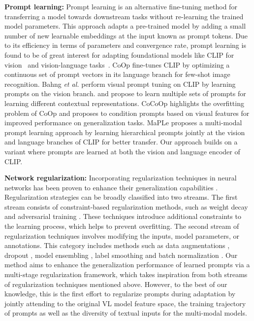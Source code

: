 \documentclass[10pt,twocolumn,letterpaper]{article}
\def\etal{\emph{et al.}\xspace}
\begin{document}
\noindent \textbf{Prompt learning:}
Prompt learning is an alternative fine-tuning method for transferring a model towards downstream tasks without re-learning the trained model parameters. This approach adapts a pre-trained model by adding a small number of new learnable embeddings at the input known as prompt tokens. Due to its efficiency in terms of parameters and convergence rate, prompt learning is found to be of great interest for adapting  foundational models like CLIP for vision~\cite{jia2022visual,zhang2022neural,wang2022dualprompt,wang2022learning} and vision-language tasks~\cite{zhou2022learning,zhou2022conditional, zhu2022prompt, derakhshani2022variational}. CoOp \cite{zhou2022learning} fine-tunes CLIP by optimizing a continuous set of prompt vectors in its language branch for few-shot image recognition. Bahng \etal \cite{bahng2022visual} perform visual prompt tuning on CLIP by learning prompts on the vision branch. \cite{chen2022prompt} and \cite{lu2022prompt} propose to learn multiple sets of prompts for learning different contextual representations. CoCoOp \cite{zhou2022conditional} highlights the overfitting problem of CoOp and proposes to condition prompts based on visual features for improved performance on generalization tasks. {MaPLe \cite{khattak2023maple} proposes a multi-modal prompt learning approach by learning hierarchical prompts jointly at the vision and language branches of CLIP for better transfer.} Our approach builds on a variant \cite{rasheed2023fine} where prompts are learned at both the vision and language encoder of CLIP.

\noindent \textbf{Network regularization:}
Incorporating regularization techniques in neural networks has been proven to enhance their generalization capabilities \cite{lee2022cross}. Regularization strategies can be broadly classified into two streams. The first stream consists of constraint-based regularization methods, such as weight decay \cite{loshchilov2017decoupled} and adversarial training \cite{yi2021improved}. These techniques introduce additional constraints to the learning process, which helps to prevent overfitting. The second stream of regularization techniques involves modifying the inputs, model parameters, or annotations. This category includes methods such as data augmentations \cite{yun2019cutmix, zhang2017mixup, cubuk2020randaugment}, dropout \cite{srivastava2014dropout}, model ensembling \cite{ilharco2022patching, wortsman2022robust}, label smoothing \cite{szegedy2016rethinking} and batch normalization \cite{ioffe2015batch}. Our method aims to enhance the generalization performance of learned prompts via a multi-stage regularization framework, which takes inspiration from both streams of regularization techniques mentioned above. However, to the best of our knowledge, this is the first effort to regularize prompts during adaptation by jointly attending to the original VL model feature space, the training trajectory of prompts as well as the diversity of textual inputs for the multi-modal models. 
\end{document}
